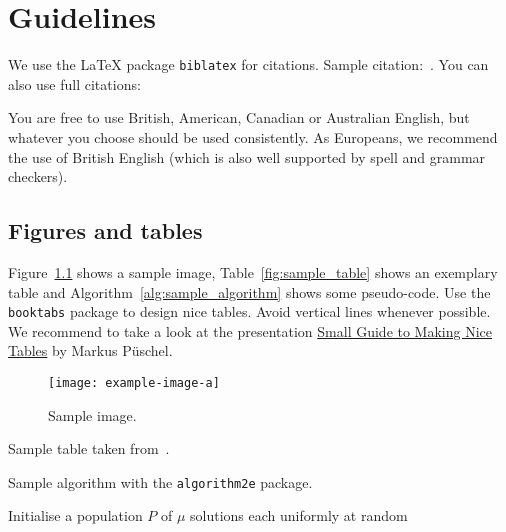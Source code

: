 \chapter{Guidelines}
\label{chap:guidelines}

We use the \LaTeX{} package \texttt{biblatex} for citations. Sample citation:~\cite{HutterEtAl2009}. You can also use full citations: 

You are free to use British, American, Canadian or Australian English, but whatever you choose should be used consistently.
As Europeans, we recommend the use of British English (which is also well supported by spell and grammar checkers).

\section{Figures and tables}

Figure~\ref{fig:sample_image} shows a sample image, Table~\ref{fig:sample_table} shows an exemplary table and Algorithm~\ref{alg:sample_algorithm} shows some pseudo-code. Use the \texttt{booktabs} package to design nice tables. Avoid vertical lines whenever possible. We recommend to take a look at the presentation \href{https://people.inf.ethz.ch/markusp/teaching/guides/guide-tables.pdf}{Small Guide to Making Nice Tables} by Markus P\"uschel.

\begin{figure}
    \centering
    \texttt{[image: example-image-a]}
    \caption{Sample image.}
    \label{fig:sample_image}
\end{figure}

\begin{table}
  \centering
    \renewcommand{\tabcolsep}{4pt}
    \renewcommand{\arraystretch}{1.1}
    
    \caption{Sample table taken from~\cite{BossekKN00T19TSPcreative}.}
    \label{fig:sample_table}
\end{table}

\begin{algorithm}
\caption{Sample algorithm with the \texttt{algorithm2e} package.}
\label{alg:sample_algorithm}
Initialise a population $P$ of $\mu$ solutions each uniformly at random\;
\end{algorithm}

